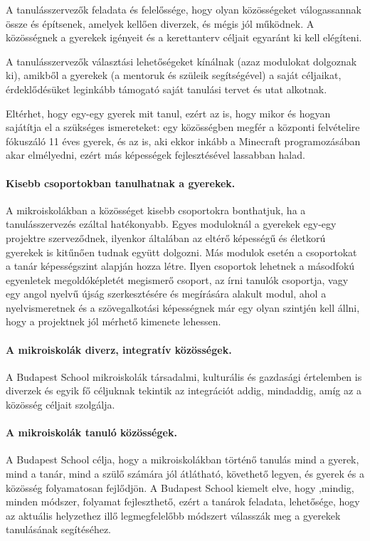 A tanulásszervezők feladata és felelőssége, hogy olyan közösségeket
válogassannak össze és építsenek, amelyek kellően diverzek, és mégis jól
működnek. A közösségnek a gyerekek igényeit és a kerettanterv céljait egyaránt
ki kell elégíteni.

A tanulásszervezők választási lehetőségeket kínálnak (azaz modulokat dolgoznak
ki), amikből a gyerekek (a mentoruk és szüleik segítségével) a saját céljaikat,
érdeklődésüket leginkább támogató saját tanulási tervet és utat alkotnak.

Eltérhet, hogy egy-egy gyerek mit tanul, ezért az is, hogy mikor és hogyan
sajátítja el a szükséges ismereteket: egy közösségben megfér a központi
felvételire fókuszáló 11 éves gyerek, és az is, aki ekkor inkább a Minecraft
programozásában akar elmélyedni, ezért más képességek fejlesztésével lassabban
halad.

\paragraph{Kisebb csoportokban tanulhatnak a gyerekek.}
\label{sec:csoportbontasok}

A mikroiskolákban a közösséget kisebb csoportokra bonthatjuk, ha a
tanulásszervezés ezáltal hatékonyabb. Egyes moduloknál a gyerekek egy-egy
projektre szerveződnek, ilyenkor általában az eltérő képességű és életkorú
gyerekek is kitűnően tudnak együtt dolgozni. Más modulok esetén a csoportokat a
tanár képességszint alapján hozza létre. Ilyen csoportok lehetnek a másodfokú
egyenletek megoldóképletét megismerő csoport, az írni tanulók csoportja, vagy
egy angol nyelvű újság szerkesztésére és megírására alakult modul, ahol a
nyelvismeretnek és a szövegalkotási képességnek már egy olyan szintjén kell
állni, hogy a projektnek jól mérhető kimenete lehessen.

\paragraph{A mikroiskolák diverz, integratív közösségek.}
A Budapest School mikroiskolák társadalmi, kulturális és gazdasági értelemben
is diverzek és egyik fő céljuknak tekintik az integrációt addig, mindaddig, amíg
az a közösség céljait szolgálja.

\paragraph{A mikroiskolák tanuló közösségek.}
A Budapest School célja, hogy a mikroiskolákban történő tanulás mind a gyerek,
mind a tanár, mind a szülő számára jól átlátható, követhető legyen, és gyerek
és a közösség folyamatosan fejlődjön.
A Budapest School kiemelt elve, hogy ,mindig, minden módszer, folyamat
fejleszthető, ezért a tanárok feladata, lehetősége, hogy az aktuális helyzethez
illő legmegfelelőbb módszert válasszák meg a gyerekek tanulásának segítéséhez.

